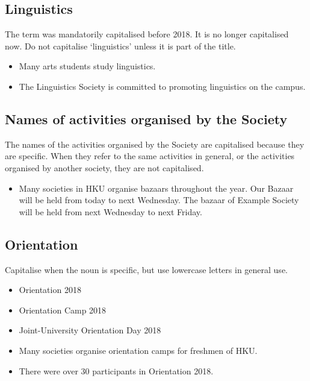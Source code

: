 \documentclass[11pt,a4paper]{book}
\newcommand{\cmark}{{\color{green(html/cssgreen)}\checkmark}}%
\begin{document}
			\subsection{Linguistics}
			The term was mandatorily capitalised before 2018. It is no longer capitalised now. Do not capitalise `linguistics' unless it is part of the title.
				{\firasans \begin{mdframed}[backgroundcolor=aliceblue] \begin{itemize}[label=\cmark]
					\item Many arts students study linguistics.
					\item The Linguistics Society is committed to promoting linguistics on the campus.
				\end{itemize} \end{mdframed} }
			\subsection{Names of activities organised by the Society}
			The names of the activities organised by the Society are capitalised because they are specific. When they refer to the same activities in general, or the activities organised by another society, they are not capitalised.
				{\firasans \begin{mdframed}[backgroundcolor=aliceblue] \begin{itemize}[label=\cmark]
					\item Many societies in HKU organise bazaars throughout the year. Our Bazaar will be held from today to next Wednesday. The bazaar of Example Society will be held from next Wednesday to next Friday.
				\end{itemize} \end{mdframed} }
			\subsection{Orientation}
			Capitalise when the noun is specific, but use lowercase letters in general use.
				{\firasans \begin{mdframed}[backgroundcolor=aliceblue] \begin{itemize}[label=\cmark]
					\item Orientation 2018
					\item Orientation Camp 2018
					\item Joint-University Orientation Day 2018
					\item Many societies organise orientation camps for freshmen of HKU.
					\item There were over 30 participants in Orientation 2018.
				\end{itemize} \end{mdframed} }
\end{document}
